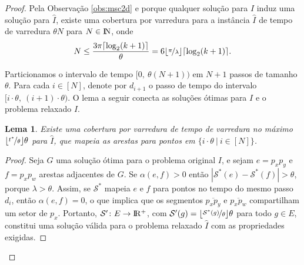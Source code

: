 \documentclass[12pt]{article}
\newtheorem{lemma}{Lema}
\DeclarePairedDelimiter\ceil{\lceil}{\rceil}
\DeclarePairedDelimiter\floor{\lfloor}{\rfloor}
\newcommand{\R}{\rm I\!R}
\newcommand{\N}{\rm I\!N}
\newcommand{\cals}{\mathcal{S}}
\begin{document}
\begin{proof}
    Pela Observação \ref{obs:msc2d} e porque qualquer solução para $I$ induz uma solução para $\hat I$, existe uma cobertura por varredura para a instância $\hat I$ de tempo de varredura $\theta N$ para $N\in \N$, onde
    \[
        N\le \frac{3\pi\ceil{\log_2(k+1)}}{\theta} = 6\floor{\nicefrac{\pi}{\lambda}} \ceil{\log_2(k+1)}.
    \]

    Particionamos o intervalo de tempo $[0,\ \theta (N+1))$ em $N+1$ passos de tamanho $\theta$.
    Para cada $i\in [N]$, denote por $d_{i+1}$ o passo de tempo do intervalo $[i \cdot \theta,\ (i+1) \cdot \theta)$.
    O lema a seguir conecta as soluções ótimas para $I$ e o problema relaxado $\hat I$.

    \begin{lemma}
        \label{obs:msc2dptas}
        Existe uma cobertura por varredura de tempo de varredura no máximo $\floor{\nicefrac{t^*}{\theta}}\theta$ para $\hat I$, que mapeia as arestas para pontos em $\{i\cdot \theta\ |\ i\in [N]\}$.
    \end{lemma}

    \begin{proof}
        Seja $G$ uma solução ótima para o problema original $I$, e sejam $e=p_xp_y$ e $f=p_xp_w$ arestas adjacentes de $G$. Se $\alpha(e, f)>0$ então $|\cals^*(e)-\cals^*(f)|> \theta$, porque $\lambda > \theta$.
        Assim, se $\cals^*$ mapeia $e$ e $f$ para pontos no tempo do mesmo passo $d_i$, então $\alpha(e, f)=0$, o que implica que os segmentos $\overline{p_xp_y}$ e $\overline{p_xp_w}$ compartilham um setor de $p_x$.
        Portanto, $\cals'\colon E\to \R^+$, com $\cals'(g)=\floor{\nicefrac{\cals^*(g)}{\theta}}\theta$ para todo $g\in E$, constitui uma solução válida para o problema relaxado $\hat I$ com as propriedades exigidas.
    \end{proof}


\end{proof}
\end{document}
